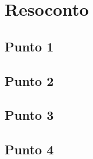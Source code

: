 \section{Resoconto}

\subsection{Punto 1}


\subsection{Punto 2}


\subsection{Punto 3}


\subsection{Punto 4}
